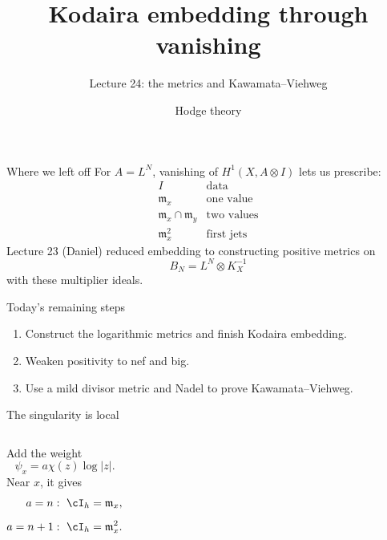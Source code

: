 
\title{Kodaira embedding through vanishing}
\subtitle{Lecture 24: the metrics and Kawamata--Viehweg}
\date{Hodge theory}

\begin{frame}\titlepage\end{frame}
\begin{frame}{Where we left off}
For \(A=L^N\), vanishing of \(H^1(X,A\otimes I)\) lets us prescribe:
\[
\begin{array}{c|c}
I&\text{data}\\ \hline
\mathfrak m_x&\text{one value}\\
\mathfrak m_x\cap\mathfrak m_y&\text{two values}\\
\mathfrak m_x^2&\text{first jets}
\end{array}
\]
Lecture 23 (Daniel) reduced embedding to constructing positive metrics on
\[
B_N=L^N\otimes K_X^{-1}
\]
with these multiplier ideals.
\end{frame}

\begin{frame}{Today's remaining steps}
\begin{enumerate}
\setlength{\itemsep}{16pt}
\item Construct the logarithmic metrics and finish Kodaira embedding.
\item Weaken positivity to nef and big.
\item Use a mild divisor metric and Nadel to prove Kawamata--Viehweg.
\end{enumerate}
\end{frame}

\begin{frame}{The singularity is local}
\begin{columns}[c]
\centering
{}
Add the weight
\[
\psi_x=a\chi(z)\log|z|.
\]
Near \(x\), it gives
\[
\begin{aligned}
a=n &: \ \cI_h=\mathfrak m_x,\\[5pt]
a=n+1 &: \ \cI_h=\mathfrak m_x^2.
\end{aligned}
\]
\end{columns}
\end{frame}

